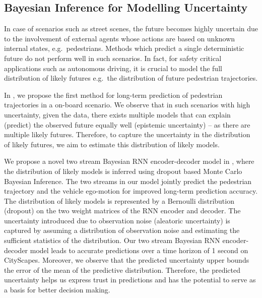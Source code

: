 \subsection{Bayesian Inference for Modelling Uncertainty}
In case of scenarios such as street scenes, the future becomes highly uncertain due to the involvement of external agents whose actions are based on unknown internal states, e.g.\ pedestrians. Methods which predict a single deterministic future do not perform well in such scenarios. In fact, for safety critical applications such as autonomous driving, it is crucial to model the full distribution of likely futures e.g.\ the distribution of future pedestrian trajectories. 

In \cite{BhattacharyyaFS18},  we propose the first method for long-term prediction of pedestrian trajectories in a on-board scenario. We observe that in such scenarios with high uncertainty, given the data, there exists multiple models that can explain (predict) the observed future equally well (epistemic uncertainty) -- as there are multiple likely futures. Therefore, to capture the uncertainty in the distribution of likely futures, we aim to estimate this distribution of likely models.

We propose a novel two stream Bayesian RNN encoder-decoder model in  \cite{BhattacharyyaFS18}, where the distribution of likely models is inferred using dropout based Monte Carlo Bayesian Inference. The two streams in our model jointly predict  the pedestrian trajectory and the vehicle ego-motion for improved long-term prediction accuracy.  The distribution of likely models is represented by a Bernoulli distribution (dropout) on the two weight matrices of the RNN encoder and decoder.  The uncertainty introduced due to observation noise (aleatoric uncertainty) is captured by assuming a distribution of observation noise and estimating the sufficient statistics of the distribution. Our  two stream Bayesian RNN encoder-decoder model leads to accurate  predictions over a time horizon of 1 second on CityScapes. Moreover, we observe that the predicted uncertainty upper bounds the error of the mean of the predictive distribution. Therefore, the predicted uncertainty helps us express trust in predictions and has the potential to serve as a basis for better decision making. 

